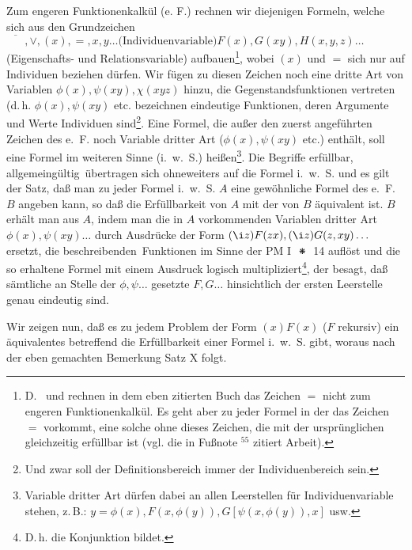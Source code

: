 \documentclass[draft]{scrartcl}
\begin{document}
Zum engeren Funktionenkalkül (e. F.) rechnen wir diejenigen Formeln, welche sich aus den Grundzeichen
$\overline{\phantom{XX}}, \lor, \left(x\right), =, x, y \dots \text{(Individuenvariable)} F\left(x\right), G\left(x y\right), H\left(x, y, z\right) \dots $
(Eigenschafts- und Relationsvariable) aufbauen\footnote{D.~ und  rechnen
in dem eben zitierten Buch das Zeichen $=$ nicht zum engeren Funktionenkalkül. Es geht aber zu jeder
Formel in der das Zeichen $=$ vorkommt, eine solche ohne dieses Zeichen, die mit der ursprünglichen
gleichzeitig erfüllbar ist (vgl. die in Fußnote $^{55}$ zitiert Arbeit).},
wobei $\left(x\right)$ und $=$ sich nur
 auf Individuen beziehen dürfen. Wir fügen zu
 diesen Zeichen noch eine dritte Art von Variablen
$\phi\left(x\right), \psi\left(x y\right), \chi\left(x y z\right)$ hinzu,
 die Gegenstandsfunktionen vertreten (d.\,h. $\phi\left(x\right), \psi\left(x y\right)$
 etc. bezeichnen eindeutige Funktionen, deren Argumente und Werte Individuen sind\footnote{Und zwar soll der Definitionsbereich immer der  Individuenbereich sein.}.
Eine Formel, die außer den zuerst angeführten Zeichen
des e.~F. noch Variable dritter Art ($\phi\left(x\right), \psi\left(x y\right)$ etc.)
enthält, soll eine Formel im weiteren Sinne (i.~w.~S.) heißen\footnote{Variable dritter Art dürfen dabei an
allen Leerstellen für Individuenvariable stehen, z.\,B.:
$y = \phi\left(x\right), F\left(x, \phi\left(y\right)\right), G\left[\psi\left(x, \phi\left(y\right)\right), x\right]$
usw.}.
Die Begriffe \glqq erfüllbar\grqq, \glqq allgemeingültig\grqq\ übertragen
sich ohneweiters auf die Formel i.~w.~S. und es gilt der Satz, daß man zu
jeder Formel i.~w.~S. $A$ eine gewöhnliche Formel des e.~F.
$B$ angeben kann, so daß die Erfüllbarkeit von $A$ mit der von $B$ äquivalent
ist. $B$ erhält man aus $A$, indem man die in $A$ vorkommenden Variablen dritter
Art $\phi\left(x\right), \psi\left(x y\right) \dots$ durch Ausdrücke der Form
$\left(\i z\right)F\left(z x\right), \left(\i z\right)G\left(z, x y\right)\dots$ ersetzt,
die \glqq beschreibenden\grqq\ Funktionen im Sinne der PM I $\pmstar$ 14
auflöst und die so erhaltene Formel mit einem Ausdruck logisch
multipliziert\footnote{D.\,h. die Konjunktion bildet.},
der besagt, daß sämtliche an Stelle der $\phi, \psi \dots$ gesetzte
$F, G\dots$ hinsichtlich der ersten Leerstelle genau eindeutig sind.

Wir zeigen nun, daß es zu jedem Problem der Form $\left(x\right)F\left(x\right)$ ($F$ rekursiv) ein äquivalentes betreffend die Erfüllbarkeit einer Formel i.~w.~S. gibt, woraus nach der eben gemachten Bemerkung Satz X folgt.
\end{document}
